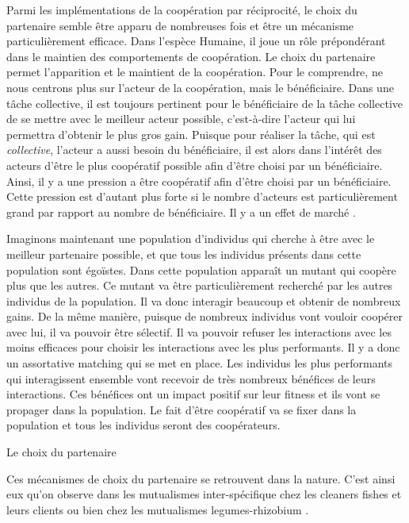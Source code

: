 Parmi les implémentations de la coopération par réciprocité, le choix du partenaire semble être apparu de nombreuses fois et être un mécanisme particulièrement efficace. Dans l'espèce Humaine, il joue un rôle prépondérant dans le maintien des comportements de coopération. Le choix du partenaire permet l'apparition et le maintient de la coopération. Pour le comprendre, ne nous centrons plus sur l'acteur de la coopération, mais le bénéficiaire. Dans une tâche collective, il est toujours pertinent pour le bénéficiaire de la tâche collective de se mettre avec le meilleur acteur possible, c'est-à-dire l'acteur qui lui permettra d'obtenir le plus gros gain. Puisque pour réaliser la tâche, qui est \emph{collective}, l'acteur a aussi besoin du bénéficiaire, il est alors dans l'intérêt des acteurs d'être le plus coopératif possible afin d'être choisi par un bénéficiaire. Ainsi, il y a une pression a être coopératif afin d'être choisi par un bénéficiaire. Cette pression est d'autant plus forte si le nombre d'acteurs est particulièrement grand par rapport au nombre de bénéficiaire. Il y a un effet de marché \citep{Noe1994}.

Imaginons maintenant une population d'individus qui cherche à être avec le meilleur partenaire possible, et que tous les individus présents dans cette population sont égoïstes. Dans cette population apparaît un mutant qui coopère plus que les autres. Ce mutant va être particulièrement recherché par les autres individus de la population. Il va donc interagir beaucoup et obtenir de nombreux gains. De la même manière, puisque de nombreux individus vont vouloir coopérer avec lui, il va pouvoir être sélectif. Il va pouvoir refuser les interactions avec les moins efficaces pour choisir les interactions avec les plus performants. Il y a donc un assortative matching qui se met en place. Les individus les plus performants qui interagissent ensemble vont recevoir de très nombreux bénéfices de leurs interactions. Ces bénéfices ont un impact positif sur leur fitness et ils vont se propager dans la population. Le fait d'être coopératif va se fixer dans la population et tous les individus seront des coopérateurs.

Le choix du partenaire

Ces mécanismes de choix du partenaire se retrouvent dans la nature. C'est ainsi eux qu'on observe dans les mutualismes inter-spécifique chez les cleaners fishes et leurs clients \citep{Bshary2002b}  ou bien chez les mutualismes legumes-rhizobium .


